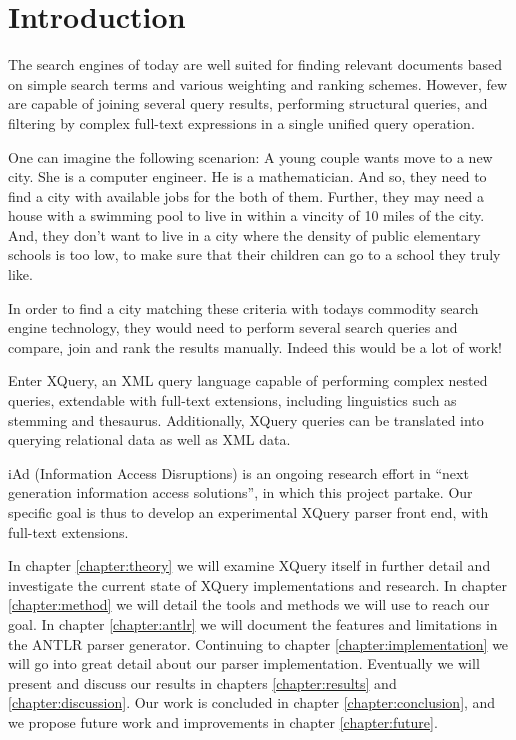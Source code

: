 \chapter{Introduction}
The search engines of today are well suited for finding relevant documents based
on simple search terms and various weighting and ranking schemes. However, few 
are capable of joining several query results, performing structural queries, and
filtering by complex full-text expressions in a single unified query operation.

One can imagine the following scenarion: A young couple wants move to a new city.
She is a computer engineer. He is a mathematician. And so, they need to find
a city with available jobs for the both of them. Further, they may need a house
with a swimming pool to live in within a vincity of 10 miles of the city. And,
they don't want to live in a city where the density of public elementary schools
is too low, to make sure that their children can go to a school they truly like.

In order to find a city matching these criteria with todays commodity search
engine technology, they would need to perform several search queries and
compare, join and rank the results manually. Indeed this would be a lot of work!

Enter XQuery, an XML query language capable of performing complex nested
queries, extendable with full-text extensions, including linguistics such as
stemming and thesaurus. Additionally, XQuery queries can be translated into
querying relational
data\cite{pathfinder_comptech}\cite{pathfinder_staircase}\cite{galatex}\cite{datadirect} 
as well as XML data.

iAd \cite{iadcentre} (Information Access Disruptions) is an ongoing research
effort in ``next generation information access solutions'', in which this
project partake. Our specific goal is thus to develop an experimental XQuery
parser front end, with full-text extensions.

In chapter \ref{chapter:theory} we will examine XQuery itself in further detail
and investigate the current state of XQuery implementations and research. In
chapter \ref{chapter:method} we will detail the tools and methods we will use to
reach our goal. In chapter \ref{chapter:antlr} we will document the features and
limitations in the ANTLR parser generator. Continuing to chapter
\ref{chapter:implementation} we will go into great detail about our parser
implementation. Eventually we will present and discuss our results in
chapters \ref{chapter:results} and \ref{chapter:discussion}. Our work is
concluded in chapter \ref{chapter:conclusion}, and we propose future work and
improvements in chapter \ref{chapter:future}.